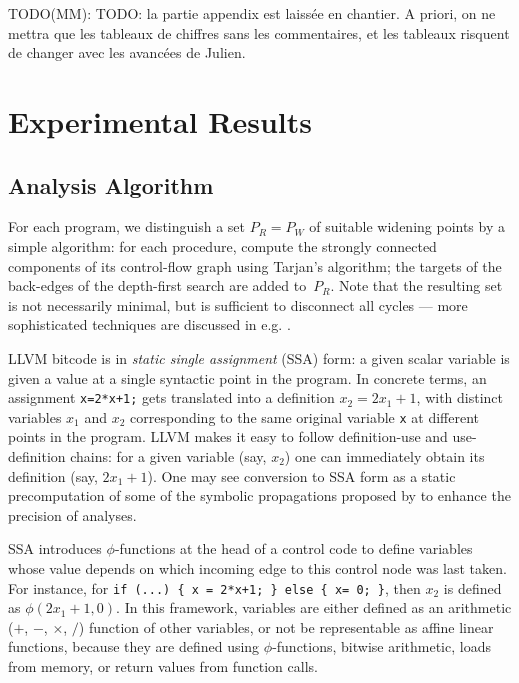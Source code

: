 \documentclass{llncs}
\newcommand{\avirer}[1]{{\color{red} #1}}
\newcommand{\MM}[1]{{\color{blue} TODO(MM): #1}}
\newcommand{\avirer}[1]{}
\newcommand{\MM}[1]{}
\begin{document}



\appendix

\MM{TODO: la partie appendix est laissée en chantier. A priori, on ne
  mettra que les tableaux de chiffres sans les commentaires, et les
  tableaux risquent de changer avec les avancées de Julien.}

\section{Experimental Results}

\subsection{Analysis Algorithm}
\label{sec:analysis-algorithm}
For each program, we distinguish a set $P_R = P_W$ of suitable widening points by a simple algorithm: for each procedure, compute the strongly connected components of its control-flow graph using Tarjan's algorithm; the targets of the back-edges of the depth-first search are added to~$P_R$. Note that the resulting set is not necessarily minimal, but is sufficient to disconnect all cycles --- more sophisticated techniques are discussed in e.g. \cite{BourdonclePhd}.

LLVM bitcode is in \emph{static single assignment} (SSA) form: a given scalar variable is given a value at a single syntactic point in the program. In concrete terms, an assignment \lstinline|x=2*x+1;| gets translated into a definition $x_2 = 2x_1+1$, with distinct variables $x_1$ and $x_2$ corresponding to the same original variable \lstinline|x| at different points in the program.
\avirer{LLVM makes it easy to follow definition-use and use-definition chains: for a given variable (say, $x_2$) one can immediately obtain its definition (say, $2x_1+1$).
One may see conversion to SSA form as a static precomputation of some of the symbolic propagations proposed by \cite{DBLP:conf/vmcai/Mine06} to enhance the precision of analyses.}

SSA introduces $\phi$-functions at the head of a control code to
define variables whose value depends on which incoming edge to this
control node was last taken. For instance, for
\lstinline|if (...) { x = 2*x+1; } else { x= 0; }|, then $x_2$ is defined as
$\phi(2x_1+1,0)$. In this framework, variables are either defined as
an arithmetic ($+$, $-$, $\times$, $/$) function of other variables,
or not be representable as affine linear functions, because they are
defined using $\phi$-functions, bitwise arithmetic, loads from memory,
or return values from function calls.
\end{document}
